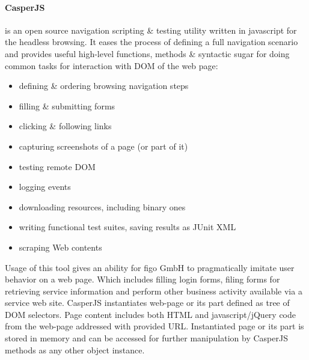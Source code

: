 \paragraph{CasperJS} is an open source navigation scripting \& testing utility written in javascript for the headless browsing. It eases the process of defining a full navigation scenario and provides useful high-level functions, methods \& syntactic sugar for doing common tasks for interaction with DOM of the web page\cite{casperjs}:
\begin{itemize}
	\item defining \& ordering browsing navigation steps
	\item filling \& submitting forms
	\item clicking \& following links
	\item capturing screenshots of a page (or part of it)
	\item testing remote DOM
	\item logging events
	\item downloading resources, including binary ones
	\item writing functional test suites, saving results as JUnit XML
	\item scraping Web contents
\end{itemize}

Usage of this tool gives an ability for figo GmbH to pragmatically imitate user behavior on a web page. Which includes filling login forms, filing forms for retrieving service information and perform other business activity available via a service web site. CasperJS instantiates web-page or its part defined as tree of DOM selectors.  Page content includes both HTML and javascript/jQuery code from the web-page addressed with provided URL. Instantiated page or its part is stored in memory and can be accessed for further manipulation by CasperJS methods as any other object instance.